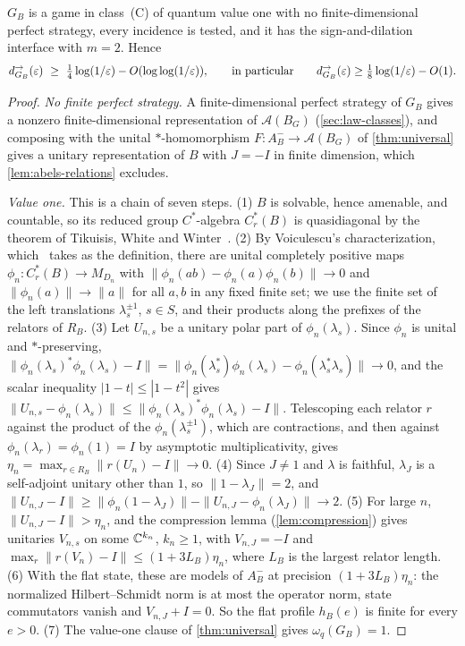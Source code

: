\begin{corollary}\label{cor:abels}
$G_B$ is a game in class~(C) of quantum value one with no finite-dimensional perfect strategy, every incidence is tested, and it
has the sign-and-dilation interface with $m=2$. Hence
\[
d^\to_{G_B}(\eps)\ \ge\ \tfrac14\log(1/\eps)-O(\log\log(1/\eps)),\qquad\text{in particular}\qquad d^\to_{G_B}(\eps)\ge\tfrac18\log(1/\eps)-O(1).
\]
\end{corollary}

\begin{proof}
\emph{No finite perfect strategy.} A finite-dimensional perfect strategy of $G_B$ gives a nonzero finite-dimensional representation
of $\mathcal A(B_G)$ (\cref{sec:law-classes}), and composing with the unital $*$-homomorphism $F:A^-_B\to\mathcal A(B_G)$ of
\cref{thm:universal} gives a unitary representation of $B$ with $J=-I$ in finite dimension, which \cref{lem:abels-relations}
excludes.

\emph{Value one.} This is a chain of seven steps.
(1) $B$ is solvable, hence amenable, and countable, so its reduced group $C^*$-algebra $C^*_r(B)$ is quasidiagonal by the theorem
of Tikuisis, White and Winter~\cite[Corollary~C]{TWW17}.
(2) By Voiculescu's characterization, which~\cite[Definition~1.1]{TWW17} takes as the definition, there are unital completely positive
maps $\phi_n:C^*_r(B)\to M_{D_n}$ with $\|\phi_n(ab)-\phi_n(a)\phi_n(b)\|\to0$ and $\|\phi_n(a)\|\to\|a\|$ for all $a,b$ in any fixed
finite set; we use the finite set of the left translations $\lambda_s^{\pm1}$, $s\in S$, and their products along the prefixes of
the relators of $R_B$.
(3) Let $U_{n,s}$ be a unitary polar part of $\phi_n(\lambda_s)$. Since $\phi_n$ is unital and $*$-preserving,
$\|\phi_n(\lambda_s)^*\phi_n(\lambda_s)-I\|=\|\phi_n(\lambda_s^*)\phi_n(\lambda_s)-\phi_n(\lambda_s^*\lambda_s)\|\to0$, and the scalar inequality
$|1-t|\le|1-t^2|$ gives $\|U_{n,s}-\phi_n(\lambda_s)\|\le\|\phi_n(\lambda_s)^*\phi_n(\lambda_s)-I\|$. Telescoping each relator $r$ against
the product of the $\phi_n(\lambda_s^{\pm1})$, which are contractions, and then against $\phi_n(\lambda_r)=\phi_n(1)=I$ by asymptotic
multiplicativity, gives $\eta_n=\max_{r\in R_B}\|r(U_n)-I\|\to0$.
(4) Since $J\ne1$ and $\lambda$ is faithful, $\lambda_J$ is a self-adjoint unitary other than $1$, so $\|1-\lambda_J\|=2$, and
$\|U_{n,J}-I\|\ge\|\phi_n(1-\lambda_J)\|-\|U_{n,J}-\phi_n(\lambda_J)\|\to2$.
(5) For large $n$, $\|U_{n,J}-I\|>\eta_n$, and the compression lemma (\cref{lem:compression}) gives unitaries $V_{n,s}$ on some $\mathbb C^{k_n}$,
$k_n\ge1$, with $V_{n,J}=-I$ and $\max_r\|r(V_n)-I\|\le(1+3L_B)\eta_n$, where $L_B$ is the largest relator length.
(6) With the flat state, these are models of $A^-_B$ at precision $(1+3L_B)\eta_n$: the normalized Hilbert--Schmidt norm is at most
the operator norm, state commutators vanish and $V_{n,J}+I=0$. So the flat profile $h_B(e)$ is finite for every $e>0$.
(7) The value-one clause of \cref{thm:universal} gives $\omega_q(G_B)=1$.


\end{proof}
